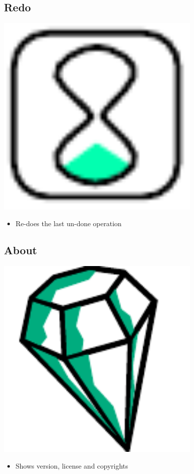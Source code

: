 \subsection{Redo}

\includegraphics[width=10cm]{../../gui/source/resources/edit_redo.pdf}
\begin{itemize}
\item Re-does the last un-done operation
\end{itemize}

\subsection{About}

\includegraphics[width=10cm]{../../gui/source/resources/crystal_facet_uml.pdf}
\begin{itemize}
\item Shows version, license and copyrights
\end{itemize}


